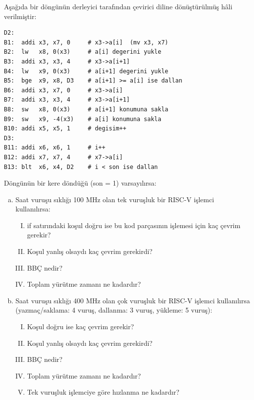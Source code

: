 \begin{alistirma}[\orta]
Aşağıda bir döngünün derleyici tarafından çevirici diline dönüştürülmüş hâli verilmiştir:

\begin{lstlisting}[style=riscv, caption={Kabarcık sıralaması -- çevirici dili (RISC-V)}]
D2:
B1:  addi x3, x7, 0     # x3->a[i]  (mv x3, x7)
B2:  lw   x8, 0(x3)     # a[i] degerini yukle
B3:  addi x3, x3, 4     # x3->a[i+1]
B4:  lw   x9, 0(x3)     # a[i+1] degerini yukle
B5:  bge  x9, x8, D3    # a[i+1] >= a[i] ise dallan
B6:  addi x3, x7, 0     # x3->a[i]
B7:  addi x3, x3, 4     # x3->a[i+1]
B8:  sw   x8, 0(x3)     # a[i+1] konumuna sakla
B9:  sw   x9, -4(x3)    # a[i] konumuna sakla
B10: addi x5, x5, 1     # degisim++
D3:
B11: addi x6, x6, 1     # i++
B12: addi x7, x7, 4     # x7->a[i]
B13: blt  x6, x4, D2    # i < son ise dallan
\end{lstlisting}

Döngünün bir kere döndüğü (son = 1) varsayılırsa:

\begin{enumerate}[(a)]
    \item Saat vuruşu sıklığı 100 MHz olan tek vuruşluk bir RISC-V işlemci kullanılırsa:
    \begin{enumerate}[I.]
        \item if satırındaki koşul doğru ise bu kod parçasının işlemesi için kaç çevrim gerekir?
        \item Koşul yanlış olsaydı kaç çevrim gerekirdi?
        \item BBÇ nedir?
        \item Toplam yürütme zamanı ne kadardır?
    \end{enumerate}
    \item Saat vuruşu sıklığı 400 MHz olan çok vuruşluk bir RISC-V işlemci kullanılırsa (yazmaç/saklama: 4 vuruş, dallanma: 3 vuruş, yükleme: 5 vuruş):
    \begin{enumerate}[I.]
        \item Koşul doğru ise kaç çevrim gerekir?
        \item Koşul yanlış olsaydı kaç çevrim gerekirdi?
        \item BBÇ nedir?
        \item Toplam yürütme zamanı ne kadardır?
        \item Tek vuruşluk işlemciye göre hızlanma ne kadardır?
    \end{enumerate}
\end{enumerate}
\end{alistirma}

